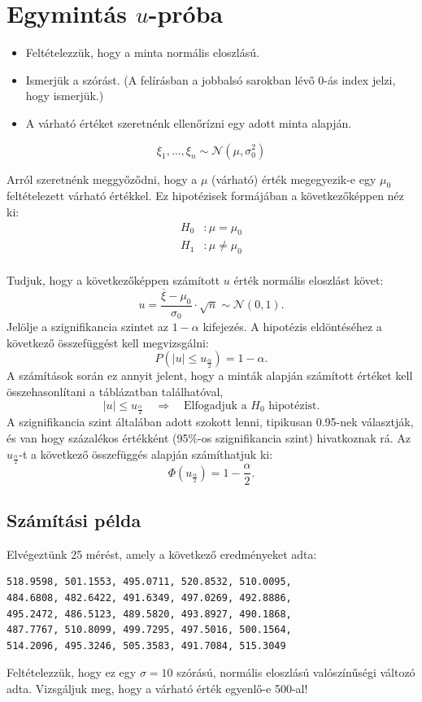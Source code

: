 \documentclass[a4paper]{article}
\begin{document}
\section{Egymintás $u$-próba}

\begin{itemize}
\item Feltételezzük, hogy a minta normális eloszlású.
\item Ismerjük a szórást. (A felírásban a jobbalsó sarokban lévő 0-ás index jelzi, hogy ismerjük.)
\item A várható értéket szeretnénk ellenőrízni egy adott minta alapján.
\end{itemize}

\[
\xi_1, \ldots, \xi_n \sim \mathcal{N}(\mu, \sigma_0^2)
\]

Arról szeretnénk meggyőződni, hogy a $\mu$ (várható) érték megegyezik-e egy $\mu_0$ feltételezett várható értékkel.
Ez hipotézisek formájában a következőképpen néz ki:
\begin{align*}
H_0 &: \mu = \mu_0 \\
H_1 &: \mu \neq \mu_0 \\
\end{align*}

Tudjuk, hogy a következőképpen számított $u$ érték normális eloszlást követ:
\[
u = \dfrac{\overline{\xi} - \mu_0}{\sigma_0} \cdot \sqrt{n} \sim \mathcal{N}(0, 1).
\]
Jelölje a szignifikancia szintet az $1 - \alpha$ kifejezés.
A hipotézis eldöntéséhez a következő összefüggést kell megvizsgálni:
\[
P\left(|u| \leq u_{\frac{\alpha}{2}}\right) = 1 - \alpha.
\]
A számítások során ez annyit jelent, hogy a minták alapján számított értéket kell összehasonlítani a táblázatban találhatóval,
\[
|u| \leq u_{\frac{\alpha}{2}} \quad \Rightarrow \quad
\text{Elfogadjuk a $H_0$ hipotézist}.
\]
A szignifikancia szint általában adott szokott lenni, tipikusan 0.95-nek választják, és van hogy százalékos értékként (95\%-os szignifikancia szint) hivatkoznak rá.
Az $u_{\frac{\alpha}{2}}$-t a következő összefüggés alapján számíthatjuk ki:
\[
\Phi\left(u_{\frac{\alpha}{2}}\right) = 1 - \dfrac{\alpha}{2}.
\]

\subsection{Számítási példa}

Elvégeztünk 25 mérést, amely a következő eredményeket adta:
\begin{verbatim}
518.9598, 501.1553, 495.0711, 520.8532, 510.0095,
484.6808, 482.6422, 491.6349, 497.0269, 492.8886,
495.2472, 486.5123, 489.5820, 493.8927, 490.1868,
487.7767, 510.8099, 499.7295, 497.5016, 500.1564,
514.2096, 495.3246, 505.3583, 491.7084, 515.3049
\end{verbatim}
Feltételezzük, hogy ez egy $\sigma = 10$ szórású, normális eloszlású valószínűségi változó adta.
Vizsgáljuk meg, hogy a várható érték egyenlő-e 500-al!
\end{document}

